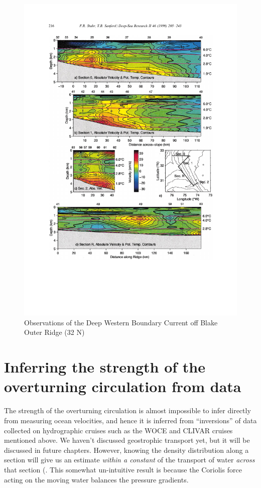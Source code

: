\begin{figure}[hbt]
  \begin{center}
    \includegraphics{figs/WaterMasses/StahrSanford99Fig4}
    \caption{Observations of the Deep Western Boundary  Current off Blake Outer Ridge (32 N) \citep{stahrsanford1999}}
    \label{fig:StahrSanford99Fig4}  
  \end{center}
\end{figure}



\section{Inferring the strength of the overturning circulation from data}

The strength of the overturning circulation is almost impossible to infer directly from measuring ocean velocities, and hence it is inferred from ``inversions'' of data collected on hydrographic cruises such as the WOCE and CLIVAR cruises mentioned above.  We haven't discussed geostrophic transport yet, but it will be discussed in future chapters.  However, knowing the density distribution along a section will give us an estimate \emph{within a constant} of the transport of water \emph{across} that section (.  This somewhat un-intuitive result is because the Coriolis force acting on the moving water balances the pressure gradients.



